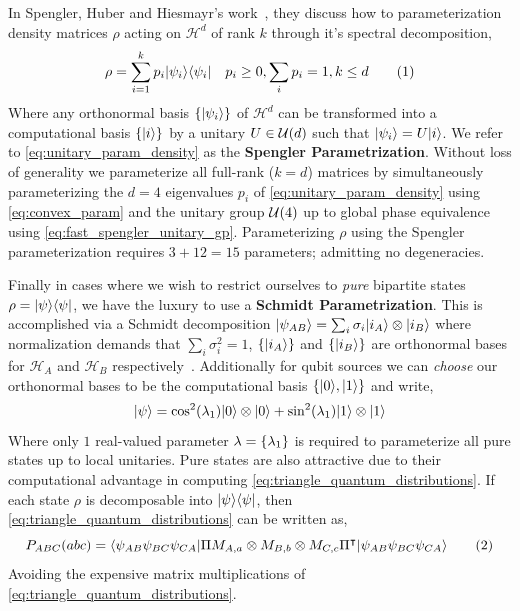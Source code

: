 \documentclass[aps, 10pt, english, twoside, pra, nofootinbib, longbibliography]{revtex4-1}
\theoremstyle{plain}
\theoremstyle{definition}
\theoremstyle{remark}
\newcommand{\netperm}{\Pi}
\newcommand{\Hilb}{\mathcal{H}}
\newcommand{\term}[1]{\textcolor{Mahogany}{\textbf{#1}}}
\begin{document}
    In Spengler, Huber and Hiesmayr's work~\cite{Spengler_2010_Unitary}, they discuss how to parameterization density matrices $\rho$ acting on $\Hilb^d$ of rank $k$ through it's spectral decomposition,
    \[ \rho = \sum_{i=1}^{k} p_i \ket{\psi_i}\bra{\psi_i} \quad p_i \geq 0, \sum_{i} p_i = 1, k \leq d \eq \label{eq:unitary_param_density} \]
    Where any orthonormal basis $\bc{\ket{\psi_i}}$ of $\Hilb^d$ can be transformed into a computational basis $\bc{\ket{i}}$ by a unitary $U \in \mathcal{U}\br{d}$ such that $\ket{\psi_i} = U\ket{i}$. We refer to \cref{eq:unitary_param_density} as the \term{Spengler Parametrization}. Without loss of generality we parameterize all full-rank ($k=d$) matrices by simultaneously parameterizing the $d=4$ eigenvalues $p_i$ of \cref{eq:unitary_param_density} using \cref{eq:convex_param} and the unitary group $\mathcal{U}\br{4}$ up to global phase equivalence using \cref{eq:fast_spengler_unitary_gp}. Parameterizing $\rho$ using the Spengler parameterization requires $3 + 12 = 15$ parameters; admitting no degeneracies.

    Finally in cases where we wish to restrict ourselves to \textit{pure} bipartite states $\rho = \ket{\psi}\bra{\psi}$, we have the luxury to use a \term{Schmidt Parametrization}. This is accomplished via a Schmidt decomposition $\ket{\psi_{AB}} = \sum_{i}\sigma_i \ket{i_A}\otimes\ket{i_B}$ where normalization demands that $\sum_{i} \sigma_i^2 = 1$, $\bc{\ket{i_A}}$ and $\bc{\ket{i_B}}$ are orthonormal bases for $\Hilb_A$ and $\Hilb_B$ respectively~\cite{Neilsen_Chaung_2011}. Additionally for qubit sources we can \textit{choose} our orthonormal bases to be the computational basis $\bc{\ket{0}, \ket{1}}$ and write,
    \[ \ket{\psi} = \cos^2\br{\lambda_1} \ket{0} \otimes \ket{0} + \sin^2\br{\lambda_1} \ket{1} \otimes \ket{1} \]
    Where only $1$ real-valued parameter $\lambda = \bc{\lambda_1}$ is required to parameterize all pure states up to local unitaries. Pure states are also attractive due to their computational advantage in computing \cref{eq:triangle_quantum_distributions}. If each state $\rho$ is decomposable into $\ket{\psi}\bra{\psi}$, then \cref{eq:triangle_quantum_distributions} can be written as,
    \[ \prob[ABC]\br{abc} = \bramidket{\psi_{AB}\psi_{BC}\psi_{CA}}{\netperm M_{A,a}\otimes M_{B,b} \otimes M_{C,c} \netperm^\intercal}{\psi_{AB}\psi_{BC}\psi_{CA}} \eq \label{eq:pure_state_quantum_triangle} \]
    Avoiding the expensive matrix multiplications of \cref{eq:triangle_quantum_distributions}.
\end{document}
